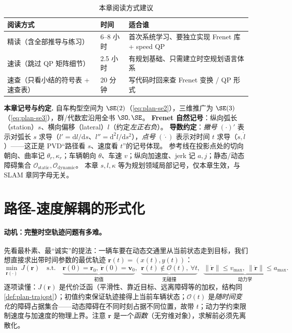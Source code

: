 \begin{table}[H]\centering\small
\caption{本章阅读方式建议}
\label{tab:fs-reading}
\begin{tabular}{lll}
\toprule
阅读方式 & 时间 & 适合谁 \\
\midrule
精读（含全部推导与练习） & 6--8 小时 & 首次系统学习、要独立实现 Frenet 库 + speed QP \\
速读（跳过 QP 矩阵细节） & 2.5 小时 & 有规划基础、只需建立时空规划语言体系 \\
速查（只看小结的符号表 + 速查表） & 20 分钟 & 写代码时回来查 Frenet 变换 / QP 形式 \\
\bottomrule
\end{tabular}
\end{table}

\begin{note}
\textbf{本章记号与约定.}\;
自车构型空间为 $\SE(2)$（\cref{eq:plan-se2}），三维推广为 $\SE(3)$（\cref{eq:plan-se3}），群/代数宏沿用全书 $\SO,\SE$。
\textbf{Frenet 自然记号}：纵向弧长（station）$s$、横向偏移（lateral）$l$（约定\emph{左正右负}）。
\textbf{导数约定}：\emph{撇号} $(\cdot)'$ 表示对弧长 $s$ 求导（$l'=\mathrm{d}l/\mathrm{d}s$、$l''=\mathrm{d}^2l/\mathrm{d}s^2$），\emph{点号} $(\dot{\cdot})$ 表示对时间 $t$ 求导（$\dot s,\dot l$）——这正是 PVD“路径看 $s$、速度看 $t$”的记号体现。
参考线在投影点处的切向朝向、曲率记 $\theta_r,\kappa_r$；车辆朝向 $\theta$、车速 $v$；纵向加速度、jerk 记 $a,j$；静态/动态障碍集合 $\mathcal{O}_{\mathrm{static}},\mathcal{O}_{\mathrm{dynamic}}$。
本章 $s,l,\kappa$ 等为规划领域局部记号，仅本章生效，与 SLAM 章同字母无关。
\end{note}

\section{路径-速度解耦的形式化}
\label{sec:fs-pvd}

\paragraph{动机：完整时空轨迹问题有多难。}
先看最朴素、最“诚实”的提法：一辆车要在动态交通里从当前状态走到目标，我们想直接求出带时间参数的最优轨迹 $\mathbf{r}(t)=(x(t),y(t))$\cite{kant1986toward}：
\begin{equation}
  \min_{\mathbf{r}(\cdot)}\ J(\mathbf{r})\quad\text{s.t.}\quad
  \underbrace{\mathbf{r}(0)=\mathbf{r}_0,\ \dot{\mathbf{r}}(0)=\mathbf{v}_0}_{\text{初值}},\ \
  \underbrace{\mathbf{r}(t)\notin\mathcal{O}(t),\ \forall t}_{\text{无碰撞}},\ \
  \underbrace{\|\dot{\mathbf{r}}\|\le v_{\max},\ \|\ddot{\mathbf{r}}\|\le a_{\max}}_{\text{动力学}}.
  \label{eq:fs-tpp}
\end{equation}
逐项读懂：$J(\mathbf{r})$ 是代价泛函（平滑性、靠近目标、远离障碍等的加权，结构同 \cref{def:plan-trajopt}）；初值约束保证轨迹接得上当前车辆状态；$\mathcal{O}(t)$ 是\emph{随时间变化}的障碍占据集合——动态障碍在不同时刻占据不同位置，故带 $t$；动力学约束限制速度与加速度的物理上界。注意 $\mathbf{r}$ 是一个\emph{函数}（无穷维对象），求解前必须先离散化。


